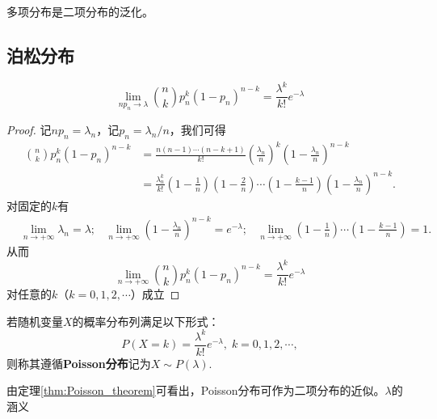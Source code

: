 \begin{remark}
    多项分布是二项分布的泛化。
\end{remark}

\subsection{泊松分布}

\begin{theorem}[Poisson逼近]\label{thm:Poisson_theorem}
    \[ \lim_{n p_n \to \lambda} \binom{n}{k} p_n^{k} (1-p_n)^{n-k} = \frac{\lambda^{k}}{k !}e^{-\lambda} \]
\end{theorem}

\begin{proof}
    记$np_n=\lambda_n$，记$p_n=\lambda_n/n$，我们可得
    \begin{align*}
        \binom {n}{k} p_n^k(1-p_n)^{n-k} & = \frac{n(n-1)\cdots(n-k+1)}{k!}\left( \frac{\lambda_n}n \right)^k \left( 1 - \frac{\lambda_n}n \right)^{n-k} \\
                                         & = \frac{\lambda_n^k}{k!}\left( 1 - \frac1n \right)\left( 1 - \frac2n \right) \cdots
        \left( 1 - \frac{k-1}n \right)
        \left( 1 - \frac{\lambda_n}n \right)^{n-k}.
    \end{align*}
    对固定的$k$有
    \begin{align*}
         & \lim_{n\to+\infty}\lambda_n = \lambda ;
         & \lim_{n\to+\infty}\left( 1 - \frac{\lambda_n}n \right)^{n-k} = e^{-\lambda} ;
         & \lim_{n\to+\infty}\left( 1 - \frac{1}{n} \right) \cdots \left( 1 - \frac{k-1}n \right) = 1.
    \end{align*}
    从而
    \[
        \lim_{n\to+\infty} \binom{n}{k} p_n^k(1-p_n)^{n-k}  = \frac{\lambda^k}{k!}e^{-\lambda}
    \]
    对任意的$k$（$k=0,1,2,\cdots$）成立
\end{proof}

\begin{definition}[Poisson分布]
    若随机变量$X$的概率分布列满足以下形式：
    \[ P(X = k) = \frac{\lambda^k}{k!}e^{-\lambda},\; k = 0,1,2,\cdots, \]
    则称其遵循\textbf{Poisson分布}记为$X\sim P(\lambda)$.
\end{definition}

\begin{remark}
    由定理\ref{thm:Poisson_theorem}可看出，Poisson分布可作为二项分布的近似。$\lambda$的涵义%
\end{remark}

